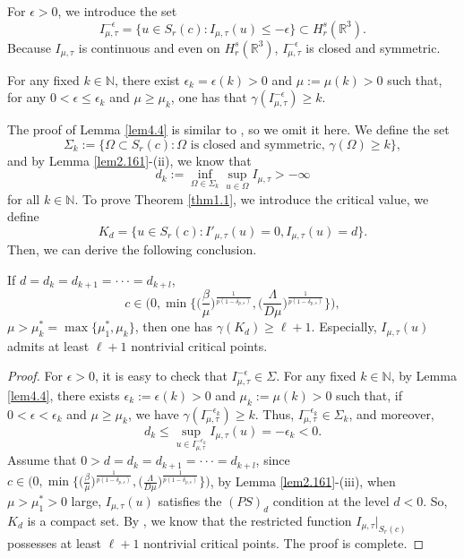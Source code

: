 \documentclass[reqno]{amsart}
\begin{document}
For $\epsilon >0$, we introduce the set
$$
I^{-\epsilon}_{\mu, \tau}=\{u\in  S_{r}(c):I_{\mu, \tau}(u)\leq -\epsilon\}
\subset H^s_{r}(\mathbb{R}^3).
$$
Because $I_{\mu, \tau}$ is continuous and even on $H^s_{r}(\mathbb{R}^3)$, 
$I^{-\epsilon}_{\mu, \tau}$ is closed and symmetric.

\begin{lemma}\label{lem4.4}
For any fixed $k\in \mathbb{N}$, there exist $\epsilon_k=\epsilon(k)>0$ and 
$\mu:=\mu(k)>0$ such that, for any $0<\epsilon\leq\epsilon_k$ and $\mu \geq \mu_k$, 
one has that $\gamma(I^{-\epsilon}_{\mu, \tau})\geq k$.
\end{lemma}

The proof of Lemma \ref{lem4.4} is similar to \cite[Lemma 3.2]{A5878}, 
so we omit it here.
We define the set
$$
\Sigma_k:=\{\Omega \subset   S_{r}(c): \Omega \text{ is  closed and symmetric, }
\gamma(\Omega)\geq k\},
$$ 
and by Lemma \ref{lem2.161}-(ii), we know that
$$
d_k:=\inf_{\Omega\in \Sigma_k}\sup_{u\in \Omega}I_{\mu, \tau}>-\infty
$$
for all $k\in \mathbb{N}$. To prove Theorem \ref{thm1.1}, we introduce the critical 
value, we define
$$
K_d=\{u\in   S_{r}(c): I'_{\mu, \tau}(u)=0, I_{\mu, \tau}(u)=d\}.
$$
Then, we can derive the following conclusion.

\begin{lemma}\label{lem4.5}
If $d=d_k=d_{k+1}=\cdot\cdot\cdot=d_{k+l}$, 
\[
c\in\Big(0, \min\Big\{\big(\frac{\beta}{\mu}\big)^{\frac{1}{p(1-\delta_{p,s})}}, 
\big(\frac{\Lambda}{D\mu}\big)^{\frac{1}{p(1-\delta_{p,s})}}\Big\}\Big),
\]
$\mu> \mu^*_k=\max\{\mu^*_1, \mu_k\}$, then one has $\gamma(K_d)\geq \ell+1$. 
Especially, $I_{\mu, \tau}(u)$ admits at least $\ell+1$ nontrivial critical points.
\end{lemma}

\begin{proof} For $\epsilon>0$, it is easy to check that 
$I^{-\epsilon}_{\mu, \tau}\in \Sigma$. For any fixed $k\in\mathbb{N}$, by Lemma 
\ref{lem4.4}, there exists $\epsilon_k:=\epsilon(k)>0$ and $\mu_k:=\mu(k)>0$ such that, 
if $0<\epsilon<\epsilon_k$ and $\mu\geq\mu_k$, we have
 $\gamma(I^{-\epsilon_k}_{\mu, \tau})\geq k$. 
 Thus, $I^{-\epsilon_k}_{\mu, \tau}\in \Sigma_k$, and moreover,
$$
d_k\leq \sup_{u\in I^{-\epsilon_k}_{\mu, \tau} }I_{\mu, \tau}(u)=-\epsilon_k<0.
$$
Assume that $0>d=d_k=d_{k+1}=\cdot\cdot\cdot=d_{k+l}$, since 
$c\in\Big(0, \min\Big\{\big(\frac{\beta}{\mu}\big)^{\frac{1}{p(1-\delta_{p,s})}}, 
\big(\frac{\Lambda}{D\mu}\big)^{\frac{1}{p(1-\delta_{p,s})}}\Big\}\Big)$, 
 by  Lemma \ref{lem2.161}-(iii), when $\mu>\mu^*_1>0$ large,   
$I_{\mu, \tau}(u)$ satisfies the $(PS)_d$ condition at the level $d<0$. 
So, $K_d$ is a compact set. By  \cite[Theorem 2.1]{L5898}, we know that the 
restricted function $I_{\mu, \tau}|_{S_r(c)}$ possesses at least $\ell+1$ 
nontrivial critical points. The proof is complete.
\end{proof}
\end{document}
